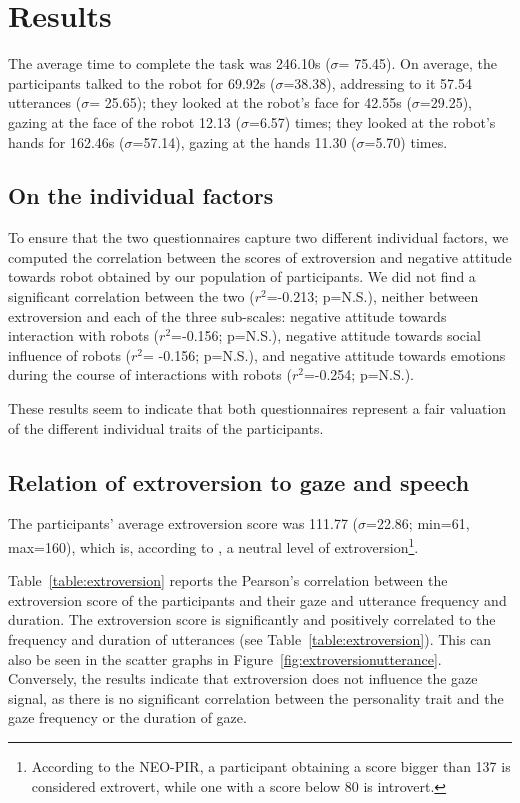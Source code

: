 \documentclass[twocolumn]{svjour3}          %
\begin{document}
\section{Results}

The average time to complete the task was 246.10s ($\sigma$= 75.45). 
On average, the participants talked to the robot for 69.92s ($\sigma$=38.38), addressing to it 57.54 utterances ($\sigma$= 25.65); they looked at the robot's face for 42.55s ($\sigma$=29.25), gazing at the face of the robot 12.13 ($\sigma$=6.57) times; they looked at the robot's hands for 162.46s ($\sigma$=57.14), gazing at the hands 11.30 ($\sigma$=5.70) times.


\subsection{On the individual factors}
To ensure that the two questionnaires capture two different individual factors, we computed the correlation between the scores of extroversion and negative attitude towards robot obtained by our population of participants.
We did not find a significant correlation between the two ($r^2$=-0.213; p=N.S.), neither between extroversion and  
each of the three sub-scales: negative attitude towards interaction with robots ($r^2$=-0.156; p=N.S.), negative attitude towards social influence of robots ($r^2$= -0.156; p=N.S.), and negative attitude towards emotions during the course of interactions with robots ($r^2$=-0.254; p=N.S.). 

These results seem to indicate that both questionnaires represent a fair valuation of the different individual traits of the participants. 


\subsection{Relation of extroversion to gaze and speech}\label{sec:extro}

The participants' average extroversion score was 111.77 ($\sigma$=22.86; min=61, max=160), which is, according to \cite{NEOPIR1998}, a neutral level of extroversion\footnote{According to the NEO-PIR, a participant obtaining a score bigger than 137 is considered extrovert, while one with a score below 80 is introvert.}. 

Table~\ref{table:extroversion} reports the Pearson's correlation between the extroversion score of the participants and their gaze and utterance frequency and duration. 
The extroversion score is significantly and positively correlated to the frequency and duration of utterances (see Table~\ref{table:extroversion}). This can also be seen in the scatter graphs in Figure~\ref{fig:extroversionutterance}.
Conversely, the results indicate that extroversion does not influence the gaze signal, as there is no significant correlation between the personality trait and the gaze frequency or the duration of gaze.
\end{document}
